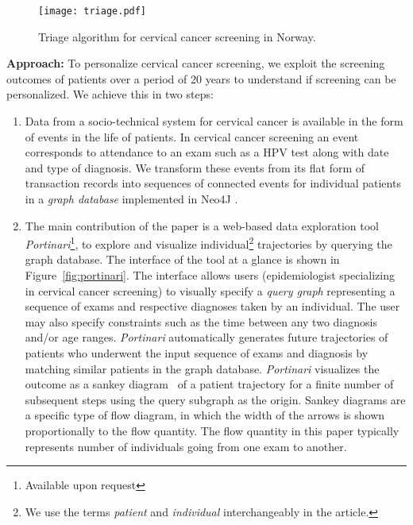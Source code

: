 \documentclass[10pt, conference]{IEEEtran}
\begin{document}
\begin{figure*}[!ht]
\centering
\texttt{[image: triage.pdf]}
\caption{Triage algorithm for cervical cancer screening in Norway.}
\label{fig:triage}
\end{figure*} 


\noindent \textbf{Approach:} To personalize cervical cancer screening, we exploit the screening outcomes of patients over a period of 20 years to understand if screening can be personalized. We achieve this in two steps:
\begin{enumerate}
\item Data from a socio-technical system for cervical cancer is  available in the form of events in the life of patients. In cervical cancer screening an event corresponds to attendance to an exam such as a HPV test along with date and type of diagnosis. We transform these events from its flat form of transaction records into sequences of connected events for individual patients in a \emph{graph database} implemented in Neo4J \cite{developers2012neo4j}.

\item The main contribution of the paper is a web-based data exploration tool \emph{Portinari}\footnote{Available upon request}, to explore and visualize individual\footnote{We use the terms \emph{patient} and \emph{individual} interchangeably in the article.} trajectories by querying the graph database. The interface of the tool at a glance is shown in Figure~\ref{fig:portinari}. The interface allows users (epidemiologist specializing in cervical cancer screening) to visually specify a \emph{query graph} representing a sequence of exams and respective diagnoses taken by an individual. The user may also specify constraints such as the time between any two diagnosis and/or age ranges. \emph{Portinari} automatically generates future trajectories of patients who underwent the input sequence of exams and diagnosis by matching similar patients in the graph database. \emph{Portinari} visualizes the outcome as a sankey diagram~\cite{martin2012visualizing} of a patient trajectory for a finite number of subsequent steps using the query subgraph as the origin. Sankey diagrams are a specific type of flow diagram, in which the width of the arrows is shown proportionally to the flow quantity. The flow quantity in this paper typically represents number of individuals going from one exam to another.
\end{enumerate}
\end{document}
